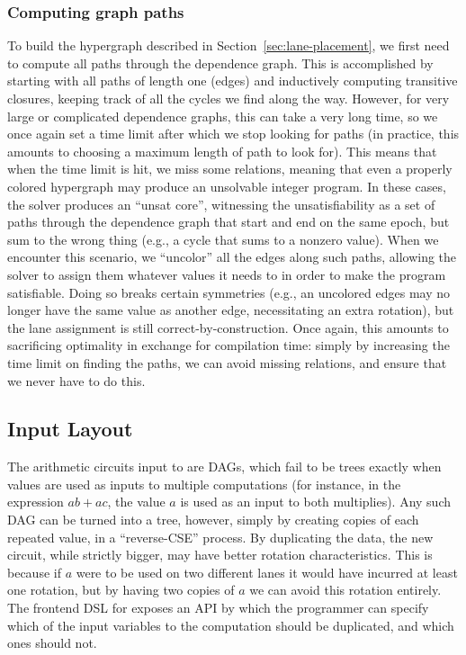 \subsubsection*{Computing graph paths}\label{sec:computing-graph-paths}
To build the hypergraph described in Section~\ref{sec:lane-placement}, we first need to compute all paths through the dependence graph.
This is accomplished by starting with all paths of length one (edges) and inductively computing transitive closures, keeping track of all the cycles we find along the way.
However, for very large or complicated dependence graphs, this can take a very long time, so we once again set a time limit after which we stop looking for paths (in practice, this amounts to choosing a maximum length of path to look for).
This means that when the time limit is hit, we miss some relations, meaning that even a properly colored hypergraph may produce an unsolvable integer program.
In these cases, the solver produces an ``unsat core'', witnessing the unsatisfiability as a set of paths through the dependence graph that start and end on the same epoch, but sum to the wrong thing (e.g., a cycle that sums to a nonzero value).
When we encounter this scenario, we ``uncolor'' all the edges along such paths, allowing the solver to assign them whatever values it needs to in order to make the program satisfiable.
Doing so breaks certain symmetries (e.g., an uncolored edges may no longer have the same value as another edge, necessitating an extra rotation), but the lane assignment is still correct-by-construction.
Once again, this amounts to sacrificing optimality in exchange for compilation time: simply by increasing the time limit on finding the paths, we can avoid missing relations, and ensure that we never have to do this.

\subsection{Input Layout}\label{sec:duplicating-inputs}
The arithmetic circuits input to \system are DAGs, which fail to be trees exactly when values are used as inputs to multiple computations (for instance, in the expression $ab + ac$, the value $a$ is used as an input to both multiplies).
Any such DAG can be turned into a tree, however, simply by creating copies of each repeated value, in a ``reverse-CSE'' process.
By duplicating the data, the new circuit, while strictly bigger, may have better rotation characteristics.
This is because if $a$ were to be used on two different lanes it would have incurred at least one rotation, but by having two copies of $a$ we can avoid this rotation entirely. The frontend DSL for \system exposes an API by which the programmer can specify which of the input variables to the computation should be duplicated, and which ones should not.

